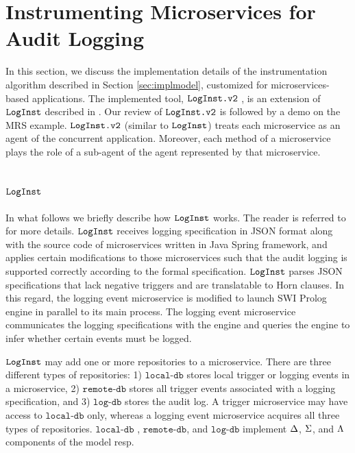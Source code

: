 \section{Instrumenting Microservices for Audit Logging}\label{sec:impl}
In this section, we discuss the implementation details of the instrumentation algorithm described in Section \ref{sec:implmodel}, customized for microservices-based applications. The implemented tool, $\texttt{LogInst.v2}$ \cite{github4}, is an extension of $\texttt{LogInst}$ \cite{github1} described in \cite{stpsa21}. Our review of $\texttt{LogInst.v2}$  is followed by a demo on the MRS example. $\texttt{LogInst.v2}$ (similar to $\texttt{LogInst}$) treats each microservice as an agent of the concurrent application. Moreover, each method of a microservice plays the role of a sub-agent of the agent represented by that microservice. 

\subsection{$\texttt{LogInst}$}
In what follows we briefly describe how $\texttt{LogInst}$ works. The reader is referred to \cite{stpsa21} for more details. $\texttt{LogInst}$ receives logging specification in JSON format along with the source code of microservices written in Java Spring framework, and applies certain modifications to those microservices such that the audit logging is supported correctly according to the formal specification. $\texttt{LogInst}$ parses JSON specifications that lack negative triggers and are translatable to Horn clauses. In this regard, the logging event microservice is modified to launch SWI Prolog  \cite{swi} engine in parallel to its main process. The logging event microservice communicates the logging specifications with the engine and queries the engine to infer whether certain events must be logged.

$\texttt{LogInst}$ may add one or more repositories to a microservice. There are three different types of repositories: 1) $\texttt{local-db}$ stores local trigger or logging events in a microservice, 2) $\texttt{remote-db}$ stores all trigger events associated with a logging specification, and 3) $\texttt{log-db}$ stores the audit log. A trigger microservice may have access to  $\texttt{local-db}$ only, whereas a logging event microservice acquires all three types of repositories. $\texttt{local-db}$ , $\texttt{remote-db}$, and $\texttt{log-db}$ implement $\Delta$, $\Sigma$, and $\Lambda$ components of the model resp.

